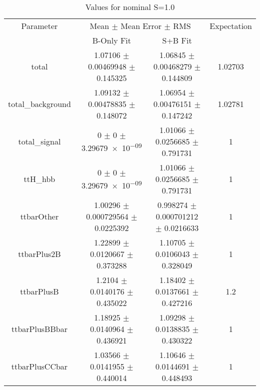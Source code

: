 \begin{table}
\centering
\caption{Values for nominal S=1.0}
\begin{tabular}{cccc}
\toprule
Parameter & \multicolumn{2}{c}{Mean $\pm$ Mean Error $\pm$ RMS} & Expectation\\
 & B-Only Fit & S+B Fit & \\
\midrule
total & \num{1.07106} $\pm$ \num{0.00469948} $\pm$ \num{0.145325} & \num{1.06845} $\pm$ \num{0.00468279} $\pm$ \num{0.144809} & \num{1.02703}\\
total\_background & \num{1.09132} $\pm$ \num{0.00478835} $\pm$ \num{0.148072} & \num{1.06954} $\pm$ \num{0.00476151} $\pm$ \num{0.147242} & \num{1.02781}\\
total\_signal & \num{0} $\pm$ \num{0} $\pm$ \num{3.29679e-09} & \num{1.01066} $\pm$ \num{0.0256685} $\pm$ \num{0.791731} & \num{1}\\
ttH\_hbb & \num{0} $\pm$ \num{0} $\pm$ \num{3.29679e-09} & \num{1.01066} $\pm$ \num{0.0256685} $\pm$ \num{0.791731} & \num{1}\\
ttbarOther & \num{1.00296} $\pm$ \num{0.000729564} $\pm$ \num{0.0225392} & \num{0.998274} $\pm$ \num{0.000701212} $\pm$ \num{0.0216633} & \num{1}\\
ttbarPlus2B & \num{1.22899} $\pm$ \num{0.0120667} $\pm$ \num{0.373288} & \num{1.10705} $\pm$ \num{0.0106043} $\pm$ \num{0.328049} & \num{1}\\
ttbarPlusB & \num{1.2104} $\pm$ \num{0.0140176} $\pm$ \num{0.435022} & \num{1.18402} $\pm$ \num{0.0137661} $\pm$ \num{0.427216} & \num{1.2}\\
ttbarPlusBBbar & \num{1.18925} $\pm$ \num{0.0140964} $\pm$ \num{0.436921} & \num{1.09298} $\pm$ \num{0.0138835} $\pm$ \num{0.430322} & \num{1}\\
ttbarPlusCCbar & \num{1.03566} $\pm$ \num{0.0141955} $\pm$ \num{0.440014} & \num{1.10646} $\pm$ \num{0.0144691} $\pm$ \num{0.448493} & \num{1}\\
\bottomrule
\end{tabular}
\end{table}